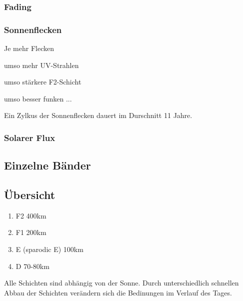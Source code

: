     \subsubsection[]{Fading}
    \subsubsection[]{Sonnenflecken}
        Je mehr Flecken
        \begin{list}{}{}
            \item umso mehr UV-Strahlen 
            \item umso stärkere F2-Schicht
            \item umso besser funken ...
        \end{list}
        Ein Zylkus der Sonnenflecken dauert im Durschnitt 11 Jahre.
    \subsubsection[]{Solarer Flux}
    \subsection[]{Einzelne Bänder}

    \subsection[]{Übersicht}
    \begin{enumerate}
        \item F2 400km
        \item F1 200km
        \item E (sparodic E) 100km
        \item D 70-80km
    \end{enumerate}
    Alle Schichten sind abhängig von der Sonne. Durch unterschiedlich schnellen Abbau der Schichten verändern sich die Bedinungen im Verlauf des Tages.